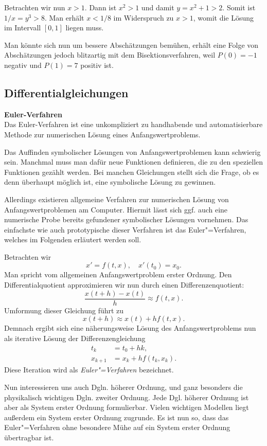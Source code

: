 \documentclass[paper=180mm:225mm,pagesize=auto,fleqn,twoside,11pt,dvipdfmx]{scrartcl}
\theoremstyle{rmbox}
\newenvironment{Rezept}[1]{\strong{#1}\\}{}
\newcommand{\strong}[1]{\textsf{\textbf{#1}}}
\begin{document}
Betrachten wir nun $x>1$. Dann ist $x^2>1$ und damit $y=x^2+1>2$.
Somit ist $1/x=y^3>8$. Man erhält $x<1/8$ im Widerspruch zu $x>1$,
womit die Lösung im Intervall $[0,1]$ liegen muss.

Man könnte sich nun um bessere Abschätzungen bemühen, erhält eine
Folge von Abschätzungen jedoch blitzartig mit dem Bisektionsverfahren,
weil $P(0)=-1$ negativ und $P(1)=7$ positiv ist.

\newpage
\subsection{Differentialgleichungen}

\begin{Rezept}{Euler-Verfahren}
Das Euler-Verfahren ist eine unkompliziert zu handhabende und
automatisierbare Methode zur numerischen Lösung eines
Anfangswertproblems.
\end{Rezept}

\noindent
Das Auffinden symbolischer Lösungen von Anfangswertproblemen kann
schwierig sein. Manchmal muss man dafür neue Funktionen definieren,
die zu den speziellen Funktionen gezählt werden. Bei manchen
Gleichungen stellt sich die Frage, ob es denn überhaupt möglich ist,
eine symbolische Lösung zu gewinnen.

Allerdings existieren allgemeine Verfahren zur numerischen Lösung von
Anfangswertproblemen am Computer. Hiermit lässt sich ggf. auch eine
numerische Probe bereits gefundener symbolischer Lösungen vornehmen.
Das einfachste wie auch prototypische dieser Verfahren ist das
Euler"=Verfahren, welches im Folgenden erläutert werden soll.

Betrachten wir
\[x' = f(t,x),\quad x'(t_0) = x_0.\]
Man spricht vom allgemeinen Anfangswertproblem erster Ordnung. Den
Differentialquotient approximieren wir nun durch einen
Differenzenquotient:%
\[\frac{x(t+h)-x(t)}{h} \approx f(t,x).\]
Umformung dieser Gleichung führt zu
\[x(t+h)\approx x(t)+hf(t,x).\]
Demnach ergibt sich eine näherungsweise Lösung des Anfangswertproblems
nun als iterative Lösung der Differenzengleichung%
\begin{align*}
t_{k} &= t_0+hk,\\
x_{k+1} &= x_k+hf(t_k,x_k).
\end{align*}
Diese Iteration wird als \emph{Euler"=Verfahren} bezeichnet.

Nun interessieren uns auch Dgln. höherer Ordnung, und ganz besonders
die physikalisch wichtigen Dgln. zweiter Ordnung. Jede Dgl. höherer
Ordnung ist aber als System erster Ordnung formulierbar. Vielen
wichtigen Modellen liegt außerdem ein System erster Ordnung zugrunde.
Es ist nun so, dass das Euler"=Verfahren ohne besondere Mühe
auf ein System erster Ordnung übertragbar ist.
\end{document}

